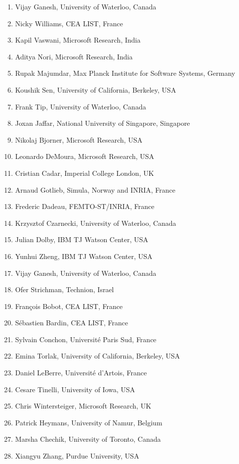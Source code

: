 \documentclass{sig-alternate}
\begin{document}
\begin{enumerate}
\item Vijay Ganesh, University of Waterloo, Canada
\item Nicky Williams, CEA LIST, France
\item Kapil Vaswani, Microsoft Research, India
\item Aditya Nori, Microsoft Research, India
\item Rupak Majumdar, Max Planck Institute for Software Systems, Germany
\item Koushik Sen, University of California, Berkeley, USA
\item Frank Tip, University of Waterloo, Canada
\item Joxan Jaffar, National University of Singapore, Singapore
\item Nikolaj Bjorner, Microsoft Research, USA
\item Leonardo DeMoura, Microsoft Research, USA
\item Cristian Cadar, Imperial College London, UK
\item Arnaud Gotlieb, Simula, Norway and INRIA, France
\item Frederic Dadeau, FEMTO-ST/INRIA, France
\item Krzysztof Czarnecki, University of Waterloo, Canada
\item Julian Dolby, IBM TJ Watson Center, USA
\item Yunhui Zheng, IBM TJ Watson Center, USA
\item Vijay Ganesh, University of Waterloo, Canada
\item Ofer Strichman, Technion, Israel
\item Fran{\c c}ois Bobot, CEA LIST, France
\item S{\'e}bastien Bardin, CEA LIST, France
\item Sylvain Conchon, Universit{\'e} Paris Sud, France
\item Emina Torlak, University of California, Berkeley, USA
\item Daniel LeBerre, Universit{\'e} d'Artois, France
\item Cesare Tinelli, University of Iowa, USA
\item Chris Wintersteiger, Microsoft Research, UK
\item Patrick Heymans, University of Namur, Belgium
\item Marsha Chechik, University of Toronto, Canada
\item Xiangyu Zhang, Purdue University, USA
\end{enumerate}
\end{document}
